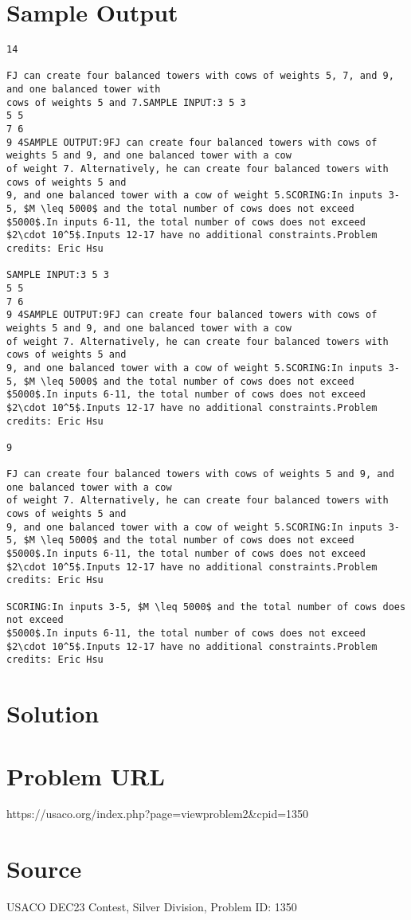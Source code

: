 \documentclass[12pt]{article}
\begin{document}
\section*{Sample Output}
\begin{verbatim}
14

FJ can create four balanced towers with cows of weights 5, 7, and 9, and one balanced tower with
cows of weights 5 and 7.SAMPLE INPUT:3 5 3
5 5
7 6
9 4SAMPLE OUTPUT:9FJ can create four balanced towers with cows of weights 5 and 9, and one balanced tower with a cow
of weight 7. Alternatively, he can create four balanced towers with cows of weights 5 and
9, and one balanced tower with a cow of weight 5.SCORING:In inputs 3-5, $M \leq 5000$ and the total number of cows does not exceed
$5000$.In inputs 6-11, the total number of cows does not exceed $2\cdot 10^5$.Inputs 12-17 have no additional constraints.Problem credits: Eric Hsu

SAMPLE INPUT:3 5 3
5 5
7 6
9 4SAMPLE OUTPUT:9FJ can create four balanced towers with cows of weights 5 and 9, and one balanced tower with a cow
of weight 7. Alternatively, he can create four balanced towers with cows of weights 5 and
9, and one balanced tower with a cow of weight 5.SCORING:In inputs 3-5, $M \leq 5000$ and the total number of cows does not exceed
$5000$.In inputs 6-11, the total number of cows does not exceed $2\cdot 10^5$.Inputs 12-17 have no additional constraints.Problem credits: Eric Hsu

9

FJ can create four balanced towers with cows of weights 5 and 9, and one balanced tower with a cow
of weight 7. Alternatively, he can create four balanced towers with cows of weights 5 and
9, and one balanced tower with a cow of weight 5.SCORING:In inputs 3-5, $M \leq 5000$ and the total number of cows does not exceed
$5000$.In inputs 6-11, the total number of cows does not exceed $2\cdot 10^5$.Inputs 12-17 have no additional constraints.Problem credits: Eric Hsu

SCORING:In inputs 3-5, $M \leq 5000$ and the total number of cows does not exceed
$5000$.In inputs 6-11, the total number of cows does not exceed $2\cdot 10^5$.Inputs 12-17 have no additional constraints.Problem credits: Eric Hsu
\end{verbatim}

\section*{Solution}


\section*{Problem URL}
https://usaco.org/index.php?page=viewproblem2&cpid=1350

\section*{Source}
USACO DEC23 Contest, Silver Division, Problem ID: 1350
\end{document}
